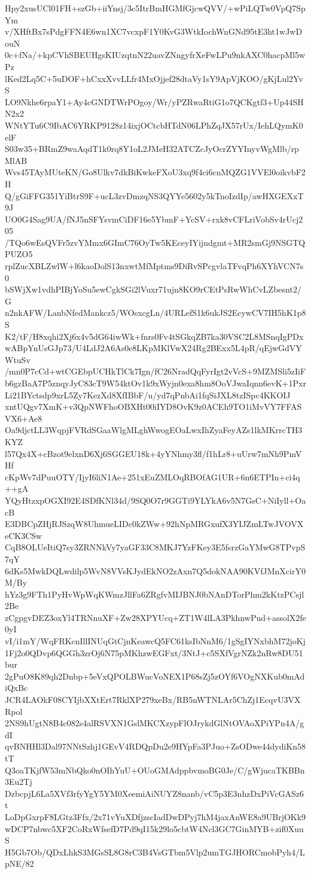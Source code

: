 Hpy2xusUCl01FH+szGb+iiYnsj/3c5ItrBmHGMfGjcwQVV/+wPiLQTw0VpQ7SpYm
v/XHftBx7sPdgFFN4E6wn1XC7vcxpF1Y0KvG3WtkIochWnGNd95tE3ht1wJwDouN
0c+fNa/+kpCVhSBEUHgsKIUzqtnN22uavZNngyfrXeFwLPu9nkAXC0hacpMl5wPz
lKed2Lq5C+5uDOF+hCxxXvvLLfr4MxOjjef28dtaVy1sY9ApVjKOO/gKjLul2YvS
LO9Nkhe6rpaY1+Ay4cGNDTWrPOgoy/Wr/yPZRwaRtiG1o7QCKgtf3+Up44SHN2x2
WNtYTu6C9IbAC6YRKP9128z14ixjOCtcbHTdN06LPhZqJX57rUx/IehLQymK0elF
S03w35+BRmZ9waAqdT1k0rq8Y1oL2JMeH32ATCZcJyOcrZYYInyvWgMlb/rpMlAB
Wvs45TAyMUteKN/Go8Ulkv7dkBiKwkeFXoU3xq9f4ci6cnMQZG1VVEl0oikvbF2H
Q/gGiFFG351YiBtrS9F+ucL3zvDmzqNS3QYYe5602y5kTnoIzdIp/awHXGEXxT9J
UO0G4Sag9UA/fNJ5nSFYsvmCiDF16e5YbmF+YcSV+rxk8vCFLriVobSv4rUcj205
/TQo6wEsQVFr5zvYMmx6GImC76OyTw5KEceyIYijndgmt+MR2smGj9NSGTQPUZO5
rplZucXBLZwlW+l6kaoDolS13nxwtMfMptms9DiRvSPcgvlaTFvqPh6XYhVCN7s0
bSWjXw1vdhPIBjYoSu5ewCgkSGi2lVuxr71ujn8KO9rCEtPsRwWhCvLZbesnt2/G
n2nkAFW/LanbNfedMankcz5/WOsxcgLn/4URLefS1k6ukJS2EcywCV7IH5hK1p8S
K2/tF/H8xqhi2Xj6x4v5dG64iwWk+fnrs0Fv4tSGkqZB7ka30VSC2L8MSnqIgPDx
wABpYnUsGJp73/U4LdJ2A6As0e8LKpMKlVwX24Rg2BExx5L4pR/qEjwGdVYWtuSv
/mn0P7cCd+wtCGEbpUCHkTlCk7Ign/fC26NradQqFyrIgt2vVcS+9MZMSli5zIiF
b6gzBaA7P5znqyJyC83cT9W54ktOv1k9xWyjn0exa8hm8OoVJwaIqnn6evK+1Pxr
Li21BYctsdp9xrL5Zy7KezXd8XfIBbF/u/yd7qPnbAi1fqSiJXL8tzISpc4KKOIJ
xntUQgv7XmK+v3QpNWFhoOBXHt00iIYD8OvK9z0ACEh9TO1iMvVY7FFASVX6+Ae8
Oa9djctLL3WqpjFVRdSGaaWlgMLghWwogEOaLwxIhZyaFeyAZs1lkMKrrcTH3KYZ
l57Qx4X+cBzot9elxnD6Xj6SGGEU18k+4yYNhmy3fl/f1hLr8+uUrw7mNh9PmVHf
cKpWv7dPuuOTY/IjyI6liN1Ae+251xEuZMLOqRBOfAG1UR+6n6ETPIn+ci4q++gA
YQyHtzxpOGXI92E4SDfKNl34d/9SQ0O7r9GGTi9YLYkA6v5N7GsC+NiIyll+OacB
E3DBCpZHjRJSzqW8UhmueLIDc0kZWw+92hNpMRGxufX3YIJZmLTwJVOVXeCK3CSw
CqB8OLUeItiQ7sy3ZRNNkVy7yaGF33C8MKJ7YzFKey3E5fsrzGaYMwG8TPvpS7qY
6dKs5MwkDQLwdilp5WvN8VVsKJydEkNO2zAxn7Q5dokNAA90KVfJMnXcirY0M/By
hYz3g9FTh1PyHvWpWqKWmzJllFa6ZRgfvMIJBNJ0bNAnDTorPhm2kKtzPCsjl2Be
zCgpgvDEZ3oxYl4TRNnuXF+Zw28XPYUcq+ZT1W4lLA3PkhnwPud+assolX2fe0yI
vI/i1mY/WqFRKcnIllINUqGtCjnKeawcQ5FC61ksIbNnM6/1gSgIYNxbhM72joKj
1Fj2o0QDvp6QGGh3zrOj6N75pMKhzwEGFxt/3NtJ+c5SXfVgrNZk2nRw8DU51bur
2gPuO8K89qh2Dnbp+5eVxQPOLBWucVoNEX1P68sZj5zOYf6VOgNXKub0mAdiQxBc
JCR4LAOkF08CYIjbXXtErt7RklXP279xeBx/RB5nWTNLAr5ChZj1EcqvU3VXRpol
2NS9hUgtN8B4c082s4alRSVXN1GslMKCXzypFlOJrykdGlNtOVAoXPiYPn4A/gdI
qvBNHHl3Dal97NNtSzhj1GEvV4RDQpDu2e9HYpFa3PJuo+ZsODwe44dydiKn58tT
Q3oaTKjfW53mNbQko0nOIhYuU+OUoGMAdppbvmoBG0Je/C/gWjucaTKBBn3Eu2Tj
DzbcpjL6La5XVf3rfyYgY5YM0XeemiAiNUYZ8nanb/vC5p3E3nhzDxPiVcGASz6t
LoDpGxrpF8LGtz3Ffx/2x71vYuXDfjzscIadDwDPyj7hM4jaxAnWE8a9UBrjOKk9
wDCP7nbwc5XF2CoRxWfsefD7Pd9qI15k29lo5cbtW4Ncl3GC7GinMYB+zif0XuuS
H5Gb7Ob/QDxLhkS3MGsSL8G8rC3B4VsGTbm5Vlp2umTGJHORCmobPyh4/LpNE/82
